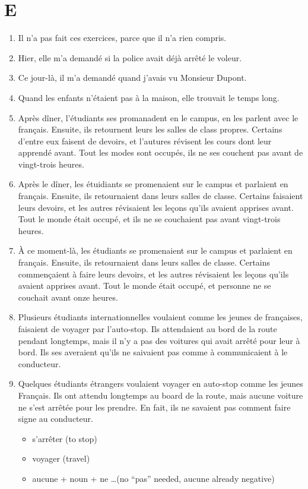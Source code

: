 \documentclass{book}
\begin{document}
    \section{E}
        \begin{enumerate}
            \item Il n'a pas fait ces exercices, parce que il n'a rien compris.
            \item Hier, elle m'a demandé si la police avait déjà arrêté le voleur.
            \item Ce jour-là, il m'a demandé quand j'avais vu Monsieur Dupont.
            \item Quand les enfants n'étaient pas à la maison, elle trouvait le temps long.
            \item Après dîner, l'étudiants ses promanadent en le campus, en les parlent avec le français. 
                    Ensuite, ils retournent leurs les salles de class propres.
                    Certains d'entre eux faisent de devoirs, et l'autures révisent les cours dont leur apprendé avant.
                    Tout les modes sont occupés, ils ne ses couchent pas avant de vingt-trois heures.
            \item Après le dîner, les étuidiants se promenaient sur le campus et parlaient en français.
                    Ensuite, ils retournaient dans leurs salles de classe.
                    Certains faisaient leurs devoirs, et les autres révisaient les leçons qu'ils avaient apprises avant.
                    Tout le monde était occupé, et ils ne se couchaient pas avant vingt-trois heures.
            \item À ce moment-là, les étudiants se  promenaient sur le campus et parlaient en français.
                    Ensuite, ils retournaient dans leurs salles de classe. 
                    Certains commençaient à faire leurs devoirs, et les autres révisaient les leçons qu'ils avaient apprises avant.
                    Tout le monde était occupé, et personne ne se couchait avant onze heures.
            \item Plusieurs étudiants internationnelles voulaient comme les jeunes de françaises, faisaient de voyager par l'auto-stop.
                    Ils attendaient au bord de la route pendant longtemps, mais il n'y a pas des voitures qui avait arrêté pour leur à bord.
                    Ils ses averaient qu'ils ne saivaient pas comme à communicaient à le conducteur.
            \item Quelques étudiants étrangers voulaient voyager en auto-stop comme les jeunes Français.
                    Ils ont attendu longtemps au board de la route, mais aucune voiture ne s'est arrêtée pour les prendre. 
                    En fait, ils ne savaient pas comment faire signe au conducteur.
                \begin{itemize}
                    \item s'arrêter (to stop)
                    \item voyager (travel)
                    \item aucune + noun + ne \dots (no ``pas'' needed, aucune already negative)
                \end{itemize}
        \end{enumerate}
\end{document}
